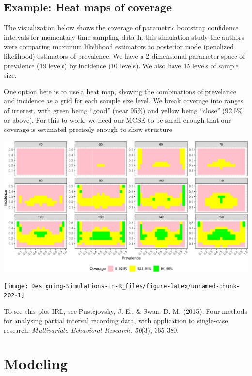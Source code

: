 \documentclass[
]{book}
\begin{document}
\subsection{Example: Heat maps of coverage}\label{example-heat-maps-of-coverage}

The visualization below shows the coverage of parametric bootstrap confidence intervals for momentary time sampling data
In this simulation study the authors were comparing maximum likelihood estimators to posterior mode (penalized likelihood) estimators of prevalence.
We have a 2-dimensional parameter space of prevalence (19 levels) by incidence (10 levels).
We also have 15 levels of sample size.

One option here is to use a heat map, showing the combinations of prevelance and incidence as a grid for each sample size level.
We break coverage into ranges of interest, with green being ``good'' (near 95\%) and yellow being ``close'' (92.5\% or above).
For this to work, we need our MCSE to be small enough that our coverage is estimated precisely enough to show structure.

\begin{center}\includegraphics[width=0.75\linewidth]{Designing-Simulations-in-R_files/figure-latex/swan_example_setup-1} \end{center}

\begin{center}\texttt{[image: Designing-Simulations-in-R\_files/figure-latex/unnamed-chunk-202-1]} \end{center}

To see this plot IRL, see Pustejovsky, J. E., \& Swan, D. M. (2015). Four methods for analyzing partial interval recording data, with application to single-case research. \emph{Multivariate Behavioral Research, 50}(3), 365-380.

\section{Modeling}\label{modeling}
\end{document}
